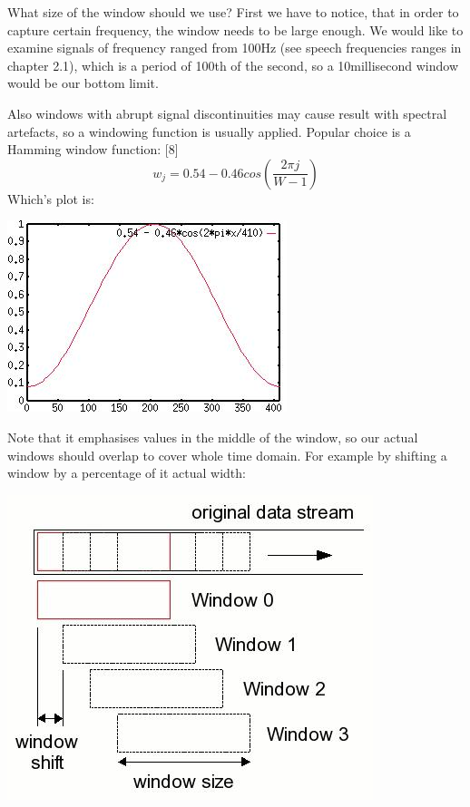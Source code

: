\documentclass[12pt,a4paper,english]{article}
\begin{document}
What size of the window should we use? First we have to notice, that in order to capture certain frequency, the window needs to be large enough. We would like to examine signals of frequency ranged from 100Hz (see speech frequencies ranges in chapter 2.1), which is a period of 100th of the second, so a 10millisecond window would be our bottom limit. \newline

Also windows with abrupt signal discontinuities may cause result with spectral artefacts, so a windowing function is usually applied. Popular choice is a Hamming window function: [8]
\begin{equation}
   w_j = 0.54 - 0.46 cos(\frac{2 \pi j}{W - 1}) 
\end{equation}
Which's plot is:
\begin{center}
    \includegraphics[scale=0.3]{hamming_window.jpg}
\end {center}

Note that it emphasises values in the middle of the window, so our actual windows should overlap to cover whole time domain. For example by shifting a window by a percentage of it actual width:
\begin{center}
    \includegraphics[scale=0.3]{window_shifting.jpg}
\end {center}
\end{document}
